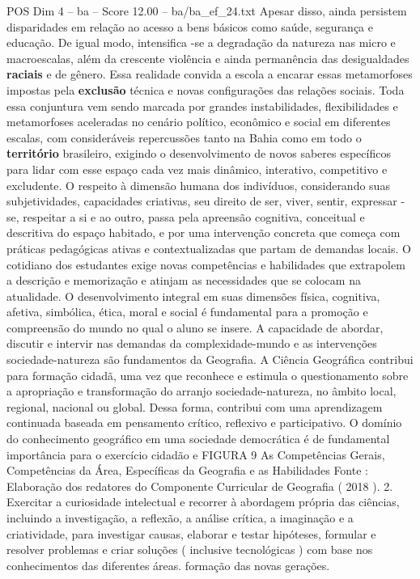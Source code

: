 \begin{textsample}{POS Dim 4 – ba – Score 12.00 – ba/ba\_ef\_24.txt}
Apesar disso, ainda persistem disparidades em relação ao acesso a bens básicos como saúde, segurança e educação.
De igual modo, intensifica -se a degradação da natureza nas micro e macroescalas, além da crescente violência e ainda permanência das desigualdades \textbf{raciais} e de gênero.
Essa realidade convida a escola a encarar essas metamorfoses impostas pela \textbf{exclusão} técnica e novas configurações das relações sociais.
Toda essa conjuntura vem sendo marcada por grandes instabilidades, flexibilidades e metamorfoses aceleradas no cenário político, econômico e social em diferentes escalas, com consideráveis repercussões tanto na Bahia como em todo o \textbf{território} brasileiro, exigindo o desenvolvimento de novos saberes específicos para lidar com esse espaço cada vez mais dinâmico, interativo, competitivo e excludente.
O respeito à dimensão humana dos indivíduos, considerando suas subjetividades, capacidades criativas, seu direito de ser, viver, sentir, expressar -se, respeitar a si e ao outro, passa pela apreensão cognitiva, conceitual e descritiva do espaço habitado, e por uma intervenção concreta que começa com práticas pedagógicas ativas e contextualizadas que partam de demandas locais.
O cotidiano dos estudantes exige novas competências e habilidades que extrapolem a descrição e memorização e atinjam as necessidades que se colocam na atualidade.
O desenvolvimento integral em suas dimensões física, cognitiva, afetiva, simbólica, ética, moral e social é fundamental para a promoção e compreensão do mundo no qual o aluno se insere.
A capacidade de abordar, discutir e intervir nas demandas da complexidade-mundo e as intervenções sociedade-natureza são fundamentos da Geografia.
A Ciência Geográfica contribui para formação cidadã, uma vez que reconhece e estimula o questionamento sobre a apropriação e transformação do arranjo sociedade-natureza, no âmbito local, regional, nacional ou global.
Dessa forma, contribui com uma aprendizagem continuada baseada em pensamento crítico, reflexivo e participativo.
O domínio do conhecimento geográfico em uma sociedade democrática é de fundamental importância para o exercício cidadão e FIGURA 9 As Competências Gerais, Competências da Área, Específicas da Geografia e as Habilidades Fonte : Elaboração dos redatores do Componente Curricular de Geografia ( 2018 ). 2.
Exercitar a curiosidade intelectual e recorrer à abordagem própria das ciências, incluindo a investigação, a reflexão, a análise crítica, a imaginação e a criatividade, para investigar causas, elaborar e testar hipóteses, formular e resolver problemas e criar soluções ( inclusive tecnológicas ) com base nos conhecimentos das diferentes áreas. formação das novas gerações.

\end{textsample}
